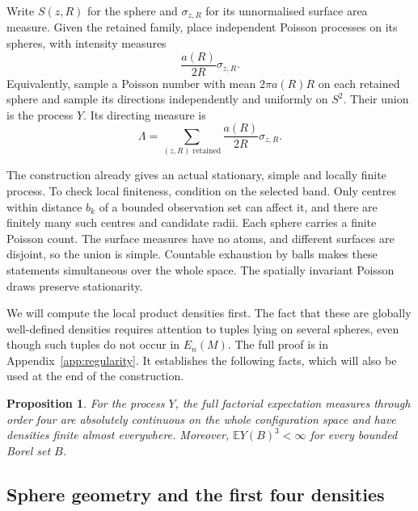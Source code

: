 \documentclass[11pt,a4paper]{article}
\numberwithin{equation}{section}
\newtheorem{proposition}[theorem]{Proposition}
\theoremstyle{definition}
\theoremstyle{remark}
\newcommand{\E}{\mathbb E}
\begin{document}
Write $S(z,R)$ for the sphere and $\sigma_{z,R}$ for its unnormalised
surface area measure. Given the retained family, place independent Poisson
processes on its spheres, with intensity measures
\begin{equation}
 \frac{a(R)}{2R}\sigma_{z,R}.
 \label{eq:surface-intensity}
\end{equation}
Equivalently, sample a Poisson number with mean $2\pi a(R)R$ on each
retained sphere and sample its directions independently and uniformly on
$S^2$. Their union is the process $Y$. Its directing measure is
\begin{equation}
 \Lambda=\sum_{(z,R)\text{ retained}}
                   \frac{a(R)}{2R}\sigma_{z,R}.
 \label{eq:Lambda}
\end{equation}

The construction already gives an actual stationary, simple and locally
finite process. To check local finiteness, condition on the selected band.
Only centres within distance $b_k$ of a bounded observation set can affect
it, and there are finitely many such centres and candidate radii. Each
sphere carries a finite Poisson count. The surface measures have no atoms,
and different surfaces are disjoint, so the union is simple. Countable
exhaustion by balls makes these statements simultaneous over the whole
space. The spatially invariant Poisson draws preserve stationarity.

We will compute the local product densities first. The fact that these
are globally well-defined densities requires attention to tuples lying
on several spheres, even though such tuples do not occur in $E_n(M)$.
The full proof is in Appendix~\ref{app:regularity}. It establishes the
following facts, which will also be used at the end of the construction.

\begin{proposition}\label{prop:sphere-regularity}
For the process $Y$, the full factorial expectation measures through
order four are absolutely continuous on the whole configuration space
and have densities finite almost everywhere. Moreover,
$\E Y(B)^3<\infty$ for every bounded Borel set $B$.
\end{proposition}

\subsection{Sphere geometry and the first four densities}
\label{subsec:sphere-densities}
\end{document}
